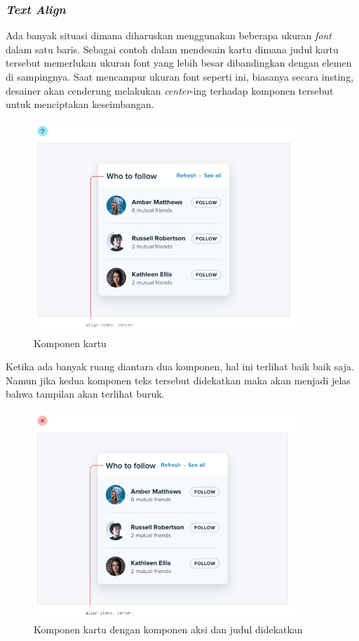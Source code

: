 \subsubsection{\textit{Text Align}} 
Ada banyak situasi dimana diharuskan menggunakan beberapa ukuran \textit{font} dalam satu baris. Sebagai contoh dalam mendesain kartu dimana judul kartu tersebut memerlukan ukuran font yang lebih besar dibandingkan dengan elemen di sampingnya. Saat mencampur ukuran font seperti ini, biasanya secara insting, desainer akan cenderung melakukan \textit{center}-ing terhadap komponen tersebut untuk menciptakan keseimbangan.

 \begin{figure}[H]
	{\centering
		\includegraphics[keepaspectratio, width=10cm]{gambar/refactoring-ui-g14.png}
		\caption{Komponen kartu \citep{refactoringui}}}
	\label{gambar:refactoring-ui-g14.png}
\end{figure}

Ketika ada banyak ruang diantara dua komponen, hal ini terlihat baik baik saja. Namun jika kedua komponen teks tersebut didekatkan maka akan menjadi jelas bahwa tampilan akan terlihat buruk.
\begin{figure}[H]
	{\centering
		\includegraphics[keepaspectratio, width=10cm]{gambar/refactoring-ui-g17.png}
		\caption{Komponen kartu dengan komponen aksi dan judul didekatkan \citep{refactoringui}}}
	\label{gambar:refactoring-ui-g17.png}
\end{figure}

